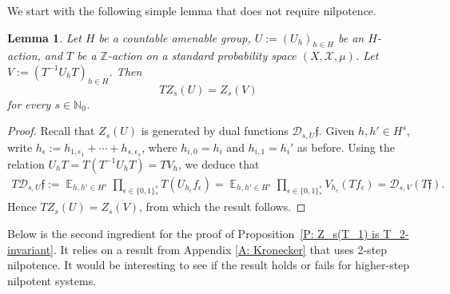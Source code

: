 \documentclass[11pt]{amsart}
\newtheorem{lemma}{Lemma}[section]
\theoremstyle{definition}
\DeclareMathOperator*{\E}{\mathbb{E}}
\newcommand{\N}{{\mathbb N}}
\newcommand{\Z}{{\mathbb Z}}
\newcommand{\CD}{{\mathcal D}}
\newcommand{\CX}{{\mathcal X}}
\newcommand{\CZ}{{\mathcal Z}}
\newcommand{\eps}{\epsilon}
\newcommand{\inv}{^{-1}}
\newcommand{\1}{{\mathbf{1}}}
\begin{document}
We start with the following simple lemma that does not require nilpotence.
\begin{lemma}\label{L: conjugating factors}
    Let $H$ be a countable amenable group, $U:=(U_h)_{h\in H}$ be an $H$-action, and $T$ be a $\Z$-action on a standard probability space $(X, \CX, \mu)$.
    Let $V := (T\inv U_h T)_{h\in H}$. Then 
    {$$T Z_s(U) = Z_s(V)$$}
    for every $s\in\N_0$.
\end{lemma}
\begin{proof}
    Recall that $Z_s(U)$ is generated by dual functions $\CD_{s,U}\mathfrak{f}$. Given $h,h'\in H^s$, write $h_\eps:=h_{1,\eps_1}+\cdots + h_{s,\eps_s}$, where $h_{i,0} =h_i$ and $h_{i,1}=h_i'$ as before. Using the relation $U_h T = T(T\inv U_hT) = T V_h$, we deduce that
    \begin{align*}
        T \CD_{s, U}\mathfrak{f}:= \E_{h,h'\in H^s}\prod_{\eps\in\{0,1\}^s_*}T (U_{h_\eps}f_\eps)= \E_{h,h'\in H^s}\prod_{\eps\in\{0,1\}^s_*}V_{h_\eps}(Tf_\eps) = \CD_{s, V}(T\mathfrak{f}).
    \end{align*}
    Hence $T Z_s(U) = Z_s(V)$, from which the result follows.
\end{proof}


Below is the second ingredient for the proof of Proposition~\ref{P: Z_s(T_1) is T_2-invariant}. It relies on a result from Appendix \ref{A: Kronecker} that uses 2-step nilpotence. It would be interesting to see if the result holds or fails for higher-step nilpotent systems.
\end{document}
